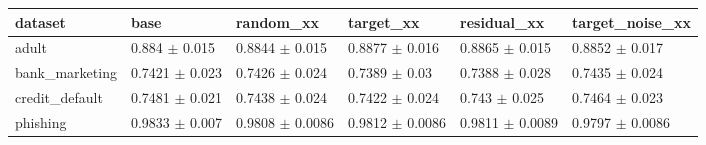 \begin{tabular}{llllll}
\toprule
dataset & base & random\_xx & target\_xx & residual\_xx & target\_noise\_xx \\
\midrule
adult & 0.884 $\pm$ 0.015 & 0.8844 $\pm$ 0.015 & 0.8877 $\pm$ 0.016 & 0.8865 $\pm$ 0.015 & 0.8852 $\pm$ 0.017 \\
bank\_marketing & 0.7421 $\pm$ 0.023 & 0.7426 $\pm$ 0.024 & 0.7389 $\pm$ 0.03 & 0.7388 $\pm$ 0.028 & 0.7435 $\pm$ 0.024 \\
credit\_default & 0.7481 $\pm$ 0.021 & 0.7438 $\pm$ 0.024 & 0.7422 $\pm$ 0.024 & 0.743 $\pm$ 0.025 & 0.7464 $\pm$ 0.023 \\
phishing & 0.9833 $\pm$ 0.007 & 0.9808 $\pm$ 0.0086 & 0.9812 $\pm$ 0.0086 & 0.9811 $\pm$ 0.0089 & 0.9797 $\pm$ 0.0086 \\
\bottomrule
\end{tabular}
